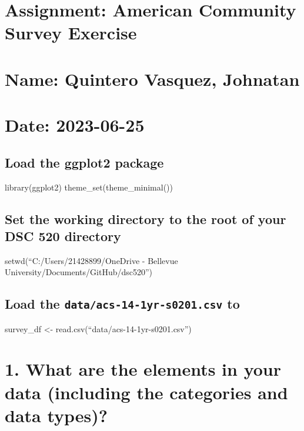 \documentclass[
]{article}
\author{}
\date{\vspace{-2.5em}}
\begin{document}
\hypertarget{assignment-american-community-survey-exercise}{%
\section{Assignment: American Community Survey
Exercise}\label{assignment-american-community-survey-exercise}}

\hypertarget{name-quintero-vasquez-johnatan}{%
\section{Name: Quintero Vasquez,
Johnatan}\label{name-quintero-vasquez-johnatan}}

\hypertarget{date-2023-06-25}{%
\section{Date: 2023-06-25}\label{date-2023-06-25}}

\hypertarget{load-the-ggplot2-package}{%
\subsection{Load the ggplot2 package}\label{load-the-ggplot2-package}}

library(ggplot2) theme\_set(theme\_minimal())

\hypertarget{set-the-working-directory-to-the-root-of-your-dsc-520-directory}{%
\subsection{Set the working directory to the root of your DSC 520
directory}\label{set-the-working-directory-to-the-root-of-your-dsc-520-directory}}

setwd(``C:/Users/21428899/OneDrive - Bellevue
University/Documents/GitHub/dsc520'')

\hypertarget{load-the-dataacs-14-1yr-s0201.csv-to}{%
\subsection{\texorpdfstring{Load the \texttt{data/acs-14-1yr-s0201.csv}
to}{Load the data/acs-14-1yr-s0201.csv to}}\label{load-the-dataacs-14-1yr-s0201.csv-to}}

survey\_df \textless- read.csv(``data/acs-14-1yr-s0201.csv'')

\hypertarget{what-are-the-elements-in-your-data-including-the-categories-and-data-types}{%
\section{1. What are the elements in your data (including the categories
and data
types)?}\label{what-are-the-elements-in-your-data-including-the-categories-and-data-types}}
\end{document}
